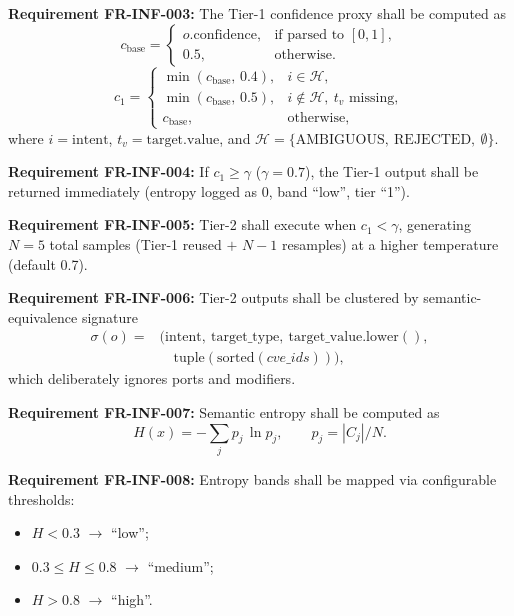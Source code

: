 ﻿\documentclass[10pt,journal,onecolumn]{IEEEtran}
\newcommand{\reqid}[1]{\textbf{#1}}
\begin{document}
\reqid{Requirement FR-INF-003:} The Tier-1 confidence proxy shall be computed as
\begin{equation}
c_{\mathrm{base}} = \begin{cases} o.\mathrm{confidence}, & \text{if parsed to } [0,1],\\ 0.5, & \text{otherwise.} \end{cases}
\end{equation}
\begin{equation}
c_{1} = \begin{cases} \min(c_{\mathrm{base}},\,0.4), & i \in \mathcal{H},\\ \min(c_{\mathrm{base}},\,0.5), & i \notin \mathcal{H},\ t_{v} \text{ missing},\\ c_{\mathrm{base}}, & \text{otherwise,} \end{cases}
\end{equation}
where $i = \mathrm{intent}$, $t_{v} = \mathrm{target.value}$, and $\mathcal{H} = \{\mathrm{AMBIGUOUS},\ \mathrm{REJECTED},\ \emptyset\}$.

\reqid{Requirement FR-INF-004:} If $c_{1} \geq \gamma$ ($\gamma = 0.7$), the Tier-1 output shall be returned immediately (entropy logged as 0, band ``low'', tier ``1'').

\reqid{Requirement FR-INF-005:} Tier-2 shall execute when $c_{1} < \gamma$, generating $N=5$ total samples (Tier-1 reused $+$ $N-1$ resamples) at a higher temperature (default 0.7).

\reqid{Requirement FR-INF-006:} Tier-2 outputs shall be clustered by semantic-equivalence signature
\begin{equation}
\begin{aligned}
\sigma(o) ={}& \bigl(\mathrm{intent},\ \mathrm{target\_type},\ \mathrm{target\_value.lower()},\\
&\quad \mathrm{tuple}(\mathrm{sorted}(cve\_ids))\bigr),
\end{aligned}
\end{equation}
which deliberately ignores ports and modifiers.

\reqid{Requirement FR-INF-007:} Semantic entropy shall be computed as
\begin{equation}
H(x) = -\sum_{j} p_{j}\, \ln p_{j}, \qquad p_{j} = |C_{j}|/N.
\end{equation}

\reqid{Requirement FR-INF-008:} Entropy bands shall be mapped via configurable thresholds:
\begin{itemize}
\item $H < 0.3$ $\rightarrow$ ``low'';
\item $0.3 \leq H \leq 0.8$ $\rightarrow$ ``medium'';
\item $H > 0.8$ $\rightarrow$ ``high''.
\end{itemize}
\end{document}
